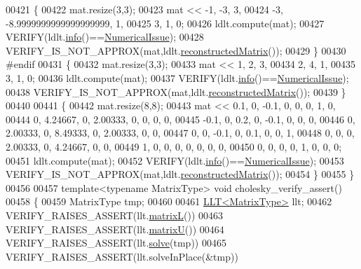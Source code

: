 \begin{DoxyCode}
00421   \{
00422     mat.resize(3,3);
00423     mat << -1, -3, 3,
00424            -3, -8.9999999999999999999, 1,
00425             3, 1, 0;
00426     ldlt.compute(mat);
00427     VERIFY(ldlt.\hyperlink{group___cholesky___module_a6bd6008501a537d2e16ea672a853bf3e}{info}()==\hyperlink{group__enums_gga85fad7b87587764e5cf6b513a9e0ee5eaaf9b736d310a664e7729d163a035cc5f}{NumericalIssue});
00428     VERIFY\_IS\_NOT\_APPROX(mat,ldlt.\hyperlink{group___cholesky___module_ae3693372ca29f50d87d324dfadaae148}{reconstructedMatrix}());
00429   \}
00430 \textcolor{preprocessor}{#endif}
00431   \{
00432     mat.resize(3,3);
00433     mat <<  1, 2, 3,
00434             2, 4, 1,
00435             3, 1, 0;
00436     ldlt.compute(mat);
00437     VERIFY(ldlt.\hyperlink{group___cholesky___module_a6bd6008501a537d2e16ea672a853bf3e}{info}()==\hyperlink{group__enums_gga85fad7b87587764e5cf6b513a9e0ee5eaaf9b736d310a664e7729d163a035cc5f}{NumericalIssue});
00438     VERIFY\_IS\_NOT\_APPROX(mat,ldlt.\hyperlink{group___cholesky___module_ae3693372ca29f50d87d324dfadaae148}{reconstructedMatrix}());
00439   \}
00440 
00441   \{
00442     mat.resize(8,8);
00443     mat <<  0.1, 0, -0.1, 0, 0, 0, 1, 0,
00444             0, 4.24667, 0, 2.00333, 0, 0, 0, 0,
00445             -0.1, 0, 0.2, 0, -0.1, 0, 0, 0,
00446             0, 2.00333, 0, 8.49333, 0, 2.00333, 0, 0,
00447             0, 0, -0.1, 0, 0.1, 0, 0, 1,
00448             0, 0, 0, 2.00333, 0, 4.24667, 0, 0,
00449             1, 0, 0, 0, 0, 0, 0, 0,
00450             0, 0, 0, 0, 1, 0, 0, 0;
00451     ldlt.compute(mat);
00452     VERIFY(ldlt.\hyperlink{group___cholesky___module_a6bd6008501a537d2e16ea672a853bf3e}{info}()==\hyperlink{group__enums_gga85fad7b87587764e5cf6b513a9e0ee5eaaf9b736d310a664e7729d163a035cc5f}{NumericalIssue});
00453     VERIFY\_IS\_NOT\_APPROX(mat,ldlt.\hyperlink{group___cholesky___module_ae3693372ca29f50d87d324dfadaae148}{reconstructedMatrix}());
00454   \}
00455 \}
00456 
00457 \textcolor{keyword}{template}<\textcolor{keyword}{typename} MatrixType> \textcolor{keywordtype}{void} cholesky\_verify\_assert()
00458 \{
00459   MatrixType tmp;
00460 
00461   \hyperlink{group___cholesky___module_class_eigen_1_1_l_l_t}{LLT<MatrixType>} llt;
00462   VERIFY\_RAISES\_ASSERT(llt.\hyperlink{group___cholesky___module_a7f4a3eedbf82e7ce2d6bf0dcd84cdfa3}{matrixL}())
00463   VERIFY\_RAISES\_ASSERT(llt.\hyperlink{group___cholesky___module_a18a390f085567e650e8345cc7e7c0df8}{matrixU}())
00464   VERIFY\_RAISES\_ASSERT(llt.\hyperlink{group___cholesky___module_a3738bb3ce6f9b837a2beb432b937499f}{solve}(tmp))
00465   VERIFY\_RAISES\_ASSERT(llt.solveInPlace(&tmp))

\end{DoxyCode}
